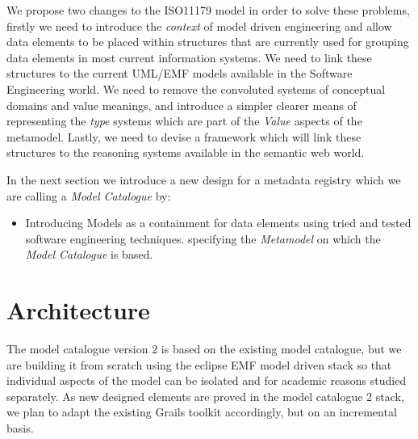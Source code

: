 \documentclass{article}
\begin{document}
We propose two changes to the ISO11179 model in order to solve these problems, firstly we need to introduce the \emph{context} of model driven engineering and allow data elements to be placed within structures that are currently used for grouping data elements in most current information systems. We need to link these structures to the current UML/EMF models available in the Software Engineering world. We need to remove the convoluted systems of conceptual domains and value meanings, and introduce a simpler clearer means of representing the \emph{type} systems which are part of the \emph{Value} aspects of the metamodel. Lastly, we need to devise a framework which will link these structures to the reasoning systems available in the semantic web world.

In the next section we introduce a new design for a metadata registry which we are calling a \emph{Model Catalogue} by:
\begin{itemize}
	\item Introducing Models as a containment for data elements using tried and tested software engineering techniques.
	\itemFormally specifying the \emph{Metamodel} on which the \emph{Model Catalogue} is based.
\end{itemize}

 

 



\section{Architecture}

The model catalogue version 2 is based on the existing model catalogue, but we are building it from scratch using the eclipse EMF model driven stack so that individual aspects of the model can be isolated and for academic reasons studied separately. As new designed elements are proved in the model catalogue 2 stack, we plan to adapt the existing Grails toolkit accordingly, but on an incremental basis.
\end{document}
